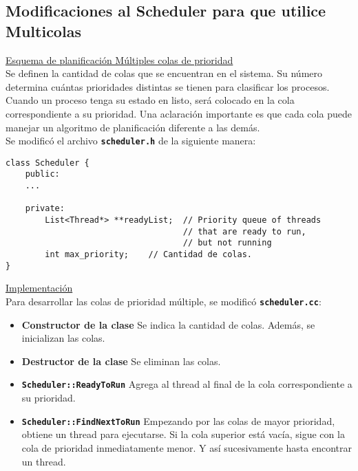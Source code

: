 \subsection*{Modificaciones al Scheduler para que utilice Multicolas}
\textsf{\underline{Esquema de planificación Múltiples colas de prioridad}}\\
Se definen la cantidad de colas que se encuentran en el sistema. Su número determina cuántas prioridades distintas se tienen para clasificar los procesos.\\
Cuando un proceso tenga su estado en listo, será colocado en la cola correspondiente a su prioridad. Una aclaración importante es que cada cola puede manejar un algoritmo de planificación diferente a las demás.\\
Se modificó el archivo \textbf{\texttt{scheduler.h}} de la siguiente manera:
\begin{lstlisting}
class Scheduler {
    public:
    ...
    
    private:
        List<Thread*> **readyList;  // Priority queue of threads
                                    // that are ready to run,
                                    // but not running
        int max_priority;    // Cantidad de colas.
}
\end{lstlisting}
\textsf{\underline{Implementación}}\\
Para desarrollar las colas de prioridad múltiple, se modificó \textbf{\texttt{scheduler.cc}}:
\begin{itemize}
    \item \textbf{Constructor de la clase} Se indica la cantidad de colas. Además, se inicializan las colas.
    \item \textbf{Destructor de la clase} Se eliminan las colas.
    \item \textbf{\texttt{Scheduler::ReadyToRun}} Agrega al thread al final de la cola correspondiente a su prioridad.
    \item \textbf{\texttt{Scheduler::FindNextToRun}} Empezando por las colas de mayor prioridad, obtiene un thread para ejecutarse. Si la cola superior está vacía, sigue con la cola de prioridad inmediatamente menor. Y así sucesivamente hasta encontrar un thread.
\end{itemize}
